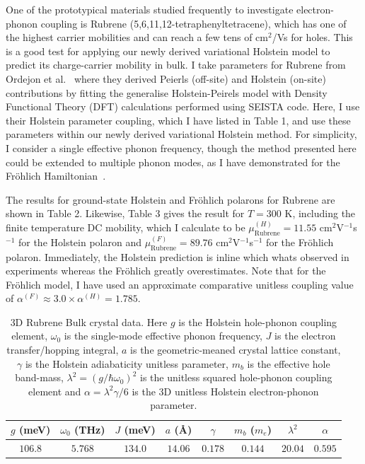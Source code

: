 One of the prototypical materials studied frequently to investigate electron-phonon coupling is Rubrene (5,6,11,12-tetraphenyltetracene), which has one of the highest carrier mobilities and can reach a few tens of cm$^2$/Vs for holes. This is a good test for applying our newly derived variational Holstein model to predict its charge-carrier mobility in bulk. I take parameters for Rubrene from Ordejon et al.~\cite{ordejon_ab_2017} where they derived Peierls (off-site) and Holstein (on-site) contributions by fitting the generalise Holstein-Peirels model with Density Functional Theory (DFT) calculations performed using SEISTA code. Here, I use their Holstein parameter coupling, which I have listed in Table 1, and use these parameters within our newly derived variational Holstein method. For simplicity, I consider a single effective phonon frequency, though the method presented here could be extended to multiple phonon modes, as I have demonstrated for the Fr\"ohlich Hamiltonian~\cite{martin_multiple_2023}.

The results for ground-state Holstein and Fr\"ohlich polarons for Rubrene are shown in Table 2. Likewise, Table 3 gives the result for $T = 300$ K, including the finite temperature DC mobility, which I calculate to be $\mu^{(H)}_{\text{Rubrene}} = 11.55$ cm$^2$V$^{-1}$s$^{-1}$ for the Holstein polaron and $\mu^{(F)}_{\text{Rubrene}} = 89.76$ cm$^2$V$^{-1}$s$^{-1}$ for the Fr\"ohlich polaron. Immediately, the Holstein prediction is inline which whats observed in experiments whereas the Fr\"ohlich greatly overestimates. Note that for the Fr\"ohlich model, I have used an approximate comparative unitless coupling value of $\alpha^{(F)} \approx 3.0 \times \alpha^{(H)} = 1.785$.

\begin{table}
    \centering
    \begin{tabular}{|c|c|c|c|c|c|c|c|}
    \hline
        $g$ (meV) & $\omega_0$ (THz) & $J$ (meV) & $a$ (Å) & $\gamma$ & $m_b$ ($m_e$) & $\lambda^2$ & $\alpha$ \\
    \hline
         $106.8$ & $5.768$ & $134.0$ & $14.06$ & $0.178$ & $0.144$ & $20.04$ & $0.595$ \\
    \hline
    \end{tabular}
    \caption{3D Rubrene Bulk crystal data. Here $g$ is the Holstein hole-phonon coupling element, $\omega_0$ is the single-mode effective phonon frequency, $J$ is the electron transfer/hopping integral, $a$ is the geometric-meaned crystal lattice constant, $\gamma$ is the Holstein adiabaticity unitless parameter, $m_b$ is the effective hole band-mass, $\lambda^2 = (g / \hbar\omega_0)^2$ is the unitless squared hole-phonon coupling element and $\alpha = \lambda^2 \gamma / 6$ is the 3D unitless Holstein electron-phonon parameter.}
    \label{tab:rubrene}
\end{table}

